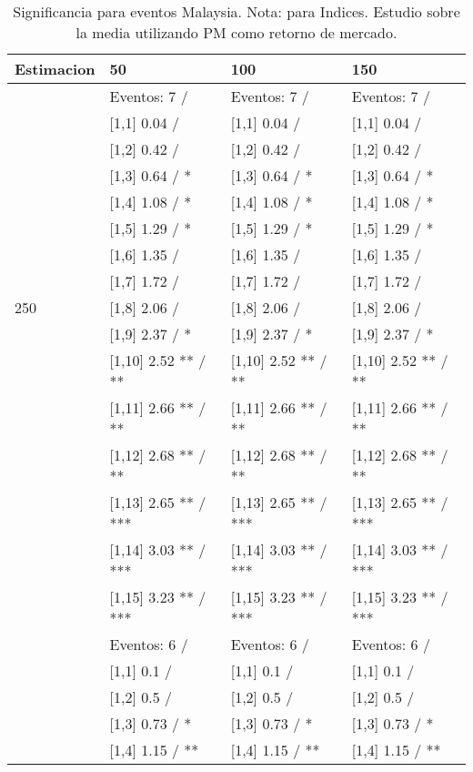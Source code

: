 \begin{table}

\caption{Significancia para eventos Malaysia. Nota: para Indices. Estudio sobre la media utilizando PM como retorno de mercado.}
\centering
\begin{tabular}[t]{llll}
\toprule
Estimacion & 50 & 100 & 150\\
\midrule
 & Eventos:  7 / & Eventos:  7 / & Eventos:  7 /\\
 & {}[1,1] 0.04  / & {}[1,1] 0.04  / & {}[1,1] 0.04  /\\
 & {}[1,2] 0.42  / & {}[1,2] 0.42  / & {}[1,2] 0.42  /\\
 & {}[1,3] 0.64  / * & {}[1,3] 0.64  / * & {}[1,3] 0.64  / *\\
 & {}[1,4] 1.08  / * & {}[1,4] 1.08  / * & {}[1,4] 1.08  / *\\
\addlinespace
 & {}[1,5] 1.29  / * & {}[1,5] 1.29  / * & {}[1,5] 1.29  / *\\
 & {}[1,6] 1.35  / & {}[1,6] 1.35  / & {}[1,6] 1.35  /\\
 & {}[1,7] 1.72  / & {}[1,7] 1.72  / & {}[1,7] 1.72  /\\
250 & {}[1,8] 2.06  / & {}[1,8] 2.06  / & {}[1,8] 2.06  /\\
 & {}[1,9] 2.37  / * & {}[1,9] 2.37  / * & {}[1,9] 2.37  / *\\
\addlinespace
 & {}[1,10] 2.52 ** / ** & {}[1,10] 2.52 ** / ** & {}[1,10] 2.52 ** / **\\
 & {}[1,11] 2.66 ** / ** & {}[1,11] 2.66 ** / ** & {}[1,11] 2.66 ** / **\\
 & {}[1,12] 2.68 ** / ** & {}[1,12] 2.68 ** / ** & {}[1,12] 2.68 ** / **\\
 & {}[1,13] 2.65 ** / *** & {}[1,13] 2.65 ** / *** & {}[1,13] 2.65 ** / ***\\
 & {}[1,14] 3.03 ** / *** & {}[1,14] 3.03 ** / *** & {}[1,14] 3.03 ** / ***\\
\addlinespace
 & {}[1,15] 3.23 ** / *** & {}[1,15] 3.23 ** / *** & {}[1,15] 3.23 ** / ***\\
 & Eventos:  6 / & Eventos:  6 / & Eventos:  6 /\\
 & {}[1,1] 0.1  / & {}[1,1] 0.1  / & {}[1,1] 0.1  /\\
 & {}[1,2] 0.5  / & {}[1,2] 0.5  / & {}[1,2] 0.5  /\\
 & {}[1,3] 0.73  / * & {}[1,3] 0.73  / * & {}[1,3] 0.73  / *\\
\addlinespace
 & {}[1,4] 1.15  / ** & {}[1,4] 1.15  / ** & {}[1,4] 1.15  / **\\

\end{tabular}
\end{table}
